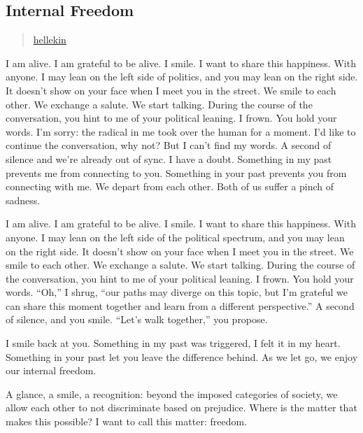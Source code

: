 \subsection{Internal Freedom}\label{internal-freedom}

\begin{quote}
\hyperlink{hellekin}{hellekin}
\end{quote}

I am alive. I am grateful to be alive. I smile. I want to share this
happiness. With anyone. I may lean on the left side of politics, and you
may lean on the right side. It doesn't show on your face when I meet you
in the street. We smile to each other. We exchange a salute. We start
talking. During the course of the conversation, you hint to me of your
political leaning. I frown. You hold your words. I'm sorry: the radical
in me took over the human for a moment. I'd like to continue the
conversation, why not? But I can't find my words. A second of silence
and we're already out of sync. I have a doubt. Something in my past
prevents me from connecting to you. Something in your past prevents you
from connecting with me. We depart from each other. Both of us suffer a
pinch of sadness.

I am alive. I am grateful to be alive. I smile. I want to share this
happiness. With anyone. I may lean on the left side of the political
spectrum, and you may lean on the right side. It doesn't show on your
face when I meet you in the street. We smile to each other. We exchange
a salute. We start talking. During the course of the conversation, you
hint to me of your political leaning. I frown. You hold your words.
``Oh,'' I shrug, ``our paths may diverge on this topic, but I'm grateful
we can share this moment together and learn from a different
perspective.'' A second of silence, and you smile. ``Let's walk
together,'' you propose.

I smile back at you. Something in my past was triggered, I felt it in my
heart. Something in your past let you leave the difference behind. As we
let go, we enjoy our internal freedom.

A glance, a smile, a recognition: beyond the imposed categories of
society, we allow each other to not discriminate based on prejudice.
Where is the matter that makes this possible? I want to call this
matter: freedom.
